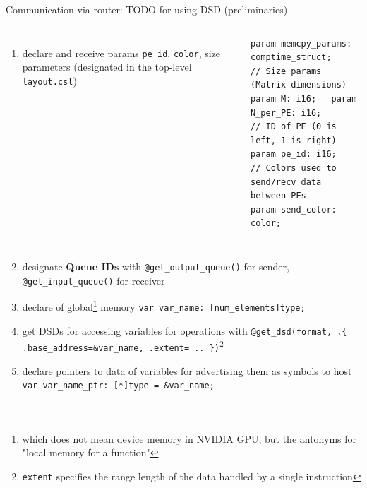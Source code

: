 \documentclass[dvipdfmx, 11pt, aspectratio=169]{beamer}   %
\begin{document}
\begin{frame}[fragile]{Communication via router: TODO for using DSD (preliminaries)}
\begin{columns}
\begin{enumerate}
    \item declare and receive params \lstinline|pe_id|, \lstinline|color|, size parameters (designated in the top-level \lstinline|layout.csl|)
\end{enumerate}
\begin{lstlisting}[language=CSL, basicstyle=\ttfamily\tiny]
param memcpy_params: comptime_struct;
// Size params (Matrix dimensions)
param M: i16;   param N_per_PE: i16;
// ID of PE (0 is left, 1 is right)
param pe_id: i16;
// Colors used to send/recv data between PEs
param send_color: color;
\end{lstlisting}
\end{columns}\vspace{-0.7\baselineskip}
\begin{columns}
\begin{enumerate}\setcounter{enumi}{1}
    \item designate \textbf{Queue IDs} with \lstinline|@get_output_queue()| for sender, \lstinline|@get_input_queue()| for receiver
    \item declare of global\footnote{which does not mean device memory in NVIDIA GPU, but the antonyms for "local memory for a function"} memory \lstinline|var var_name: [num_elements]type;|
    \item get DSDs for accessing variables for operations with \lstinline|@get_dsd(format, .{ .base_address=&var_name, .extent= .. })|\footnote{\lstinline|extent| specifies the range length of the data handled by a single instruction}
    \item declare pointers to data of variables for advertising them as symbols to host \lstinline|var var_name_ptr: [*]type = &var_name;|
\end{enumerate}
\end{columns}
\end{frame}
\end{document}
